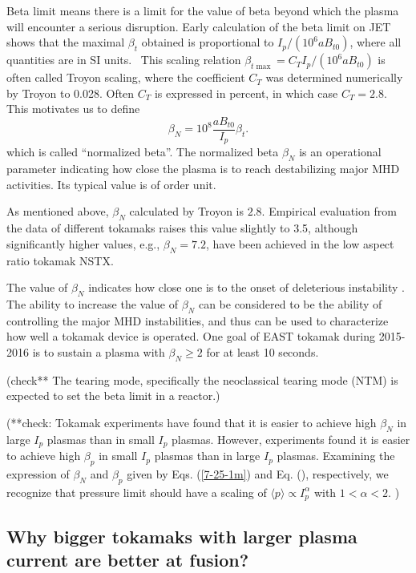 \documentclass{llncs}
\begin{document}
Beta limit means there is a limit for the value of beta beyond which the
plasma will encounter a serious disruption. Early calculation of the beta
limit on JET shows that the maximal $\beta_t$ obtained is proportional to $I_p
/ (10^6 a B_{t 0})$, where all quantities are in SI units. \ This scaling
relation $\beta_{t \max} = C_T I_p / (10^6 a B_{t 0})$ is often called Troyon
scaling, where the coefficient $C_T$ was determined numerically by Troyon to
0.028. Often $C_T$ is expressed in percent, in which case $C_T = 2.8$. This
motivates us to define
\begin{equation}
  \label{1-13-e1} \beta_N = 10^8 \frac{a B_{t 0}}{I_p} \beta_t .
\end{equation}
which is called ``normalized beta''. The normalized beta $\beta_N$ is an
operational parameter indicating how close the plasma is to reach
destabilizing major MHD activities. Its typical value is of order unit.

As mentioned above, $\beta_N$ calculated by Troyon is $2.8$. Empirical
evaluation from the data of different tokamaks raises this value slightly to
3.5, although significantly higher values, e.g., $\beta_N = 7.2$, have been
achieved in the low aspect ratio tokamak NSTX{\cite{sabbagh2006}}.

The value of $\beta_N$ indicates how close one is to the onset of deleterious
instability . The ability to increase the value of $\beta_N$ can be considered
to be the ability of controlling the major MHD instabilities, and thus can be
used to characterize how well a tokamak device is operated. One goal of EAST
tokamak during 2015-2016 is to sustain a plasma with $\beta_N \geqslant 2$ for
at least 10 seconds.

(check** The tearing mode, specifically the neoclassical tearing mode (NTM)
is expected to set the beta limit in a reactor.)

(**check: Tokamak experiments have found that it is easier to achieve high
$\beta_N$ in large $I_p$ plasmas than in small $I_p$ plasmas. However,
experiments found it is easier to achieve high $\beta_p$ in small $I_p$
plasmas than in large $I_p$ plasmas. Examining the expression of $\beta_N$ and
$\beta_p$ given by Eqs. (\ref{7-25-1m}) and Eq. (), respectively, we recognize
that pressure limit should have a scaling of $\langle p \rangle \propto
I_p^{\alpha}$ with $1 < \alpha < 2$. )

\subsection{Why bigger tokamaks with larger plasma current are better at
fusion?}
\end{document}
